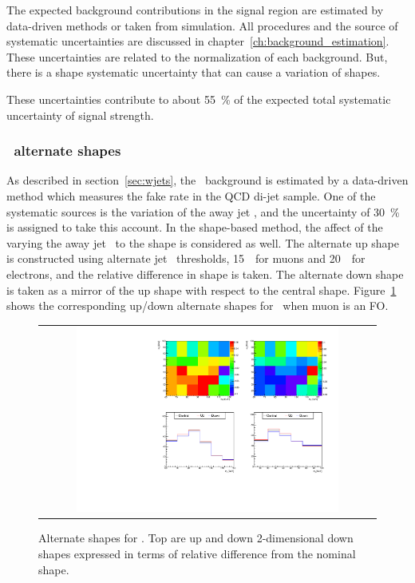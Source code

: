 The expected background contributions in the signal region are estimated by 
data-driven methods or taken from simulation.  
All procedures and the source of systematic uncertainties are discussed 
in chapter~\ref{ch:background_estimation}. These uncertainties are related 
to the normalization of each background. But, there is a shape systematic 
uncertainty that can cause a variation of shapes. 

These uncertainties contribute to about 55~\% of 
the expected total systematic uncertainty of signal strength. 


\subsubsection{\Wjets\ alternate shapes} 

As described in section~\ref{sec:wjets}, the \Wjets\ background is estimated 
by a data-driven method which measures the fake rate in the QCD di-jet sample. 
One of the systematic sources is the variation of the away jet \pt,
and the uncertainty of 30~\% is assigned to take this account. 
In the shape-based method, the affect of the varying the away jet \pt\ 
to the shape is considered as well. 
The alternate up shape is constructed using alternate jet \pt\ thresholds, 
15~\GeV\ for muons and 20~\GeV\ for electrons, and the relative difference 
in shape is taken. The alternate down shape is taken as a mirror of 
the up shape with respect to the central shape. 
Figure~\ref{fig:alter_wjets} shows the corresponding up/down alternate shapes
for \Wjets\ when muon is an FO. 
%
\begin{figure}[htp]
\centering
\begin{tabular}{c}
\includegraphics[width=0.8\textwidth]{figures/histo_WjetsM_CMS_hww_MVAWMBounding_0j_zoom.pdf}
\end{tabular}
\caption{Alternate shapes for \WjetsM. 
         Top are up and down 2-dimensional down shapes expressed in terms of relative 
         difference from the nominal shape.}
\label{fig:alter_wjets}
\end{figure}


